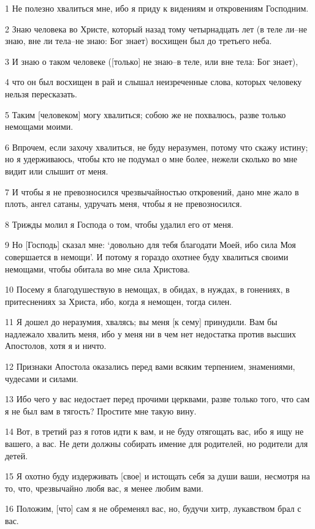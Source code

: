 \par 1 Не полезно хвалиться мне, ибо я приду к видениям и откровениям Господним.
\par 2 Знаю человека во Христе, который назад тому четырнадцать лет (в теле ли--не знаю, вне ли тела--не знаю: Бог знает) восхищен был до третьего неба.
\par 3 И знаю о таком человеке ([только] не знаю--в теле, или вне тела: Бог знает),
\par 4 что он был восхищен в рай и слышал неизреченные слова, которых человеку нельзя пересказать.
\par 5 Таким [человеком] могу хвалиться; собою же не похвалюсь, разве только немощами моими.
\par 6 Впрочем, если захочу хвалиться, не буду неразумен, потому что скажу истину; но я удерживаюсь, чтобы кто не подумал о мне более, нежели сколько во мне видит или слышит от меня.
\par 7 И чтобы я не превозносился чрезвычайностью откровений, дано мне жало в плоть, ангел сатаны, удручать меня, чтобы я не превозносился.
\par 8 Трижды молил я Господа о том, чтобы удалил его от меня.
\par 9 Но [Господь] сказал мне: `довольно для тебя благодати Моей, ибо сила Моя совершается в немощи'. И потому я гораздо охотнее буду хвалиться своими немощами, чтобы обитала во мне сила Христова.
\par 10 Посему я благодушествую в немощах, в обидах, в нуждах, в гонениях, в притеснениях за Христа, ибо, когда я немощен, тогда силен.
\par 11 Я дошел до неразумия, хвалясь; вы меня [к сему] принудили. Вам бы надлежало хвалить меня, ибо у меня ни в чем нет недостатка против высших Апостолов, хотя я и ничто.
\par 12 Признаки Апостола оказались перед вами всяким терпением, знамениями, чудесами и силами.
\par 13 Ибо чего у вас недостает перед прочими церквами, разве только того, что сам я не был вам в тягость? Простите мне такую вину.
\par 14 Вот, в третий раз я готов идти к вам, и не буду отягощать вас, ибо я ищу не вашего, а вас. Не дети должны собирать имение для родителей, но родители для детей.
\par 15 Я охотно буду издерживать [свое] и истощать себя за души ваши, несмотря на то, что, чрезвычайно любя вас, я менее любим вами.
\par 16 Положим, [что] сам я не обременял вас, но, будучи хитр, лукавством брал с вас.
